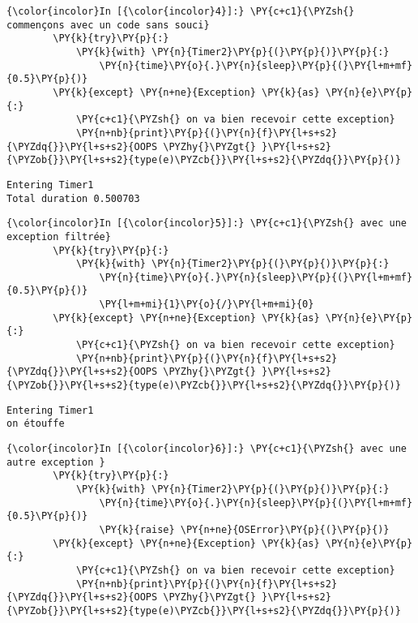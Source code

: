     \begin{Verbatim}[commandchars=\\\{\}]
{\color{incolor}In [{\color{incolor}4}]:} \PY{c+c1}{\PYZsh{} commençons avec un code sans souci}
        \PY{k}{try}\PY{p}{:}
            \PY{k}{with} \PY{n}{Timer2}\PY{p}{(}\PY{p}{)}\PY{p}{:}
                \PY{n}{time}\PY{o}{.}\PY{n}{sleep}\PY{p}{(}\PY{l+m+mf}{0.5}\PY{p}{)}
        \PY{k}{except} \PY{n+ne}{Exception} \PY{k}{as} \PY{n}{e}\PY{p}{:}
            \PY{c+c1}{\PYZsh{} on va bien recevoir cette exception}
            \PY{n+nb}{print}\PY{p}{(}\PY{n}{f}\PY{l+s+s2}{\PYZdq{}}\PY{l+s+s2}{OOPS \PYZhy{}\PYZgt{} }\PY{l+s+s2}{\PYZob{}}\PY{l+s+s2}{type(e)\PYZcb{}}\PY{l+s+s2}{\PYZdq{}}\PY{p}{)}
\end{Verbatim}


    \begin{Verbatim}[commandchars=\\\{\}]
Entering Timer1
Total duration 0.500703

    \end{Verbatim}

    \begin{Verbatim}[commandchars=\\\{\}]
{\color{incolor}In [{\color{incolor}5}]:} \PY{c+c1}{\PYZsh{} avec une exception filtrée}
        \PY{k}{try}\PY{p}{:}
            \PY{k}{with} \PY{n}{Timer2}\PY{p}{(}\PY{p}{)}\PY{p}{:}
                \PY{n}{time}\PY{o}{.}\PY{n}{sleep}\PY{p}{(}\PY{l+m+mf}{0.5}\PY{p}{)}
                \PY{l+m+mi}{1}\PY{o}{/}\PY{l+m+mi}{0}
        \PY{k}{except} \PY{n+ne}{Exception} \PY{k}{as} \PY{n}{e}\PY{p}{:}
            \PY{c+c1}{\PYZsh{} on va bien recevoir cette exception}
            \PY{n+nb}{print}\PY{p}{(}\PY{n}{f}\PY{l+s+s2}{\PYZdq{}}\PY{l+s+s2}{OOPS \PYZhy{}\PYZgt{} }\PY{l+s+s2}{\PYZob{}}\PY{l+s+s2}{type(e)\PYZcb{}}\PY{l+s+s2}{\PYZdq{}}\PY{p}{)}
\end{Verbatim}


    \begin{Verbatim}[commandchars=\\\{\}]
Entering Timer1
on étouffe

    \end{Verbatim}

    \begin{Verbatim}[commandchars=\\\{\}]
{\color{incolor}In [{\color{incolor}6}]:} \PY{c+c1}{\PYZsh{} avec une autre exception }
        \PY{k}{try}\PY{p}{:}
            \PY{k}{with} \PY{n}{Timer2}\PY{p}{(}\PY{p}{)}\PY{p}{:}
                \PY{n}{time}\PY{o}{.}\PY{n}{sleep}\PY{p}{(}\PY{l+m+mf}{0.5}\PY{p}{)}
                \PY{k}{raise} \PY{n+ne}{OSError}\PY{p}{(}\PY{p}{)}
        \PY{k}{except} \PY{n+ne}{Exception} \PY{k}{as} \PY{n}{e}\PY{p}{:}
            \PY{c+c1}{\PYZsh{} on va bien recevoir cette exception}
            \PY{n+nb}{print}\PY{p}{(}\PY{n}{f}\PY{l+s+s2}{\PYZdq{}}\PY{l+s+s2}{OOPS \PYZhy{}\PYZgt{} }\PY{l+s+s2}{\PYZob{}}\PY{l+s+s2}{type(e)\PYZcb{}}\PY{l+s+s2}{\PYZdq{}}\PY{p}{)}
\end{Verbatim}



